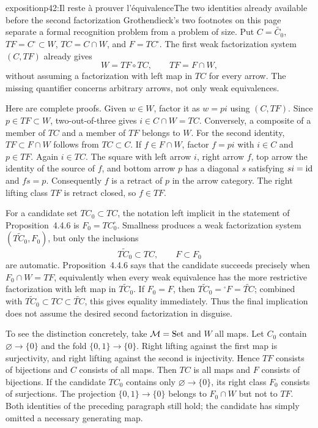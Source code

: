 \begin{dcomment}{exposition}{p42:Il reste à prouver l'équivalence}{The two identities already available before the second factorization}
Grothendieck's two footnotes on this page separate a formal recognition problem from a problem of size. Put $C=\widetilde{C_0}$, $TF=C^{\square}\subset W$, $TC=C\cap W$, and $F=TC^{\square}$. The first weak factorization system $(C,TF)$ already gives
\[
W=TF\circ TC,\qquad TF=F\cap W,
\]
without assuming a factorization with left map in $TC$ for every arrow. The missing quantifier concerns arbitrary arrows, not only weak equivalences.

Here are complete proofs. Given $w\in W$, factor it as $w=pi$ using $(C,TF)$. Since $p\in TF\subset W$, two-out-of-three gives $i\in C\cap W=TC$. Conversely, a composite of a member of $TC$ and a member of $TF$ belongs to $W$. For the second identity, $TF\subset F\cap W$ follows from $TC\subset C$. If $f\in F\cap W$, factor $f=pi$ with $i\in C$ and $p\in TF$. Again $i\in TC$. The square with left arrow $i$, right arrow $f$, top arrow the identity of the source of $f$, and bottom arrow $p$ has a diagonal $s$ satisfying $si=\mathrm{id}$ and $fs=p$. Consequently $f$ is a retract of $p$ in the arrow category. The right lifting class $TF$ is retract closed, so $f\in TF$.

For a candidate set $TC_0\subset TC$, the notation left implicit in the statement of Proposition~4.4.6 is $F_0=TC_0^{\square}$. Smallness produces a weak factorization system $(\widetilde{TC_0},F_0)$, but only the inclusions
\[
\widetilde{TC_0}\subset TC,\qquad F\subset F_0
\]
are automatic. Proposition~4.4.6 says that the candidate succeeds precisely when $F_0\cap W=TF$, equivalently when every weak equivalence has the more restrictive factorization with left map in $\widetilde{TC_0}$. If $F_0=F$, then $\widetilde{TC_0}={}^{\square}F=\widetilde{TC}$; combined with $\widetilde{TC_0}\subset TC\subset\widetilde{TC}$, this gives equality immediately. Thus the final implication does not assume the desired second factorization in disguise.

To see the distinction concretely, take $\mathcal{M}=\mathrm{Set}$ and $W$ all maps. Let $C_0$ contain $\varnothing\to\{0\}$ and the fold $\{0,1\}\to\{0\}$. Right lifting against the first map is surjectivity, and right lifting against the second is injectivity. Hence $TF$ consists of bijections and $C$ consists of all maps. Then $TC$ is all maps and $F$ consists of bijections. If the candidate $TC_0$ contains only $\varnothing\to\{0\}$, its right class $F_0$ consists of surjections. The projection $\{0,1\}\to\{0\}$ belongs to $F_0\cap W$ but not to $TF$. Both identities of the preceding paragraph still hold; the candidate has simply omitted a necessary generating map.
\end{dcomment}


